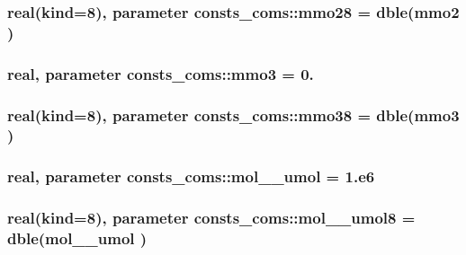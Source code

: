 \subsubsection[{\texorpdfstring{mmo28}{mmo28}}]{\setlength{\rightskip}{0pt plus 5cm}real(kind=8), parameter consts\+\_\+coms\+::mmo28 = dble({\bf mmo2} )}\hypertarget{namespaceconsts__coms_a737139f9eca5b72bd0b26f75910c55df}{}\label{namespaceconsts__coms_a737139f9eca5b72bd0b26f75910c55df}
\subsubsection[{\texorpdfstring{mmo3}{mmo3}}]{\setlength{\rightskip}{0pt plus 5cm}real, parameter consts\+\_\+coms\+::mmo3 = 0.}\hypertarget{namespaceconsts__coms_a3d2db28ffe653e18e24973962ee92eb1}{}\label{namespaceconsts__coms_a3d2db28ffe653e18e24973962ee92eb1}
\subsubsection[{\texorpdfstring{mmo38}{mmo38}}]{\setlength{\rightskip}{0pt plus 5cm}real(kind=8), parameter consts\+\_\+coms\+::mmo38 = dble({\bf mmo3} )}\hypertarget{namespaceconsts__coms_aea51cb10ed09215243c1e9b5499fc337}{}\label{namespaceconsts__coms_aea51cb10ed09215243c1e9b5499fc337}
\subsubsection[{\texorpdfstring{mol\+\_\+2\+\_\+umol}{mol_2_umol}}]{\setlength{\rightskip}{0pt plus 5cm}real, parameter consts\+\_\+coms\+::mol\+\_\+\_\+umol = 1.e6}\hypertarget{namespaceconsts__coms_a68d9924e4ce2e95d25b3c4862bf895d8}{}\label{namespaceconsts__coms_a68d9924e4ce2e95d25b3c4862bf895d8}
\subsubsection[{\texorpdfstring{mol\+\_\+2\+\_\+umol8}{mol_2_umol8}}]{\setlength{\rightskip}{0pt plus 5cm}real(kind=8), parameter consts\+\_\+coms\+::mol\+\_\+\_\+umol8 = dble({\bf mol\+\_\+\_\+umol} )}\hypertarget{namespaceconsts__coms_a667518325585dfb0f152a824bce1dcda}{}\label{namespaceconsts__coms_a667518325585dfb0f152a824bce1dcda}
